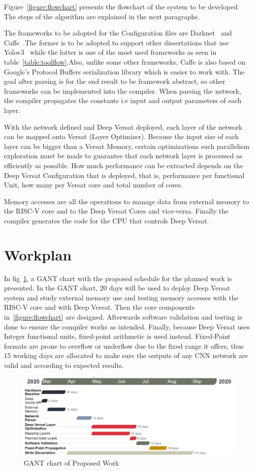 Figure~\ref{figure:flowchart} presents the flowchart of the system to be developed. The steps
of the algorithm are explained in the next paragraphs.


The frameworks to be adopted for the Configuration files are Darknet~\cite{darknet} and Caffe~\cite{caffe}.The former is to be adopted
to support other dissertations that use Yolov3~\cite{yolov3} while the latter is one of the most used frameworks as seen in table~\ref{table:toolflow}.Also,
unlike some other frameworks, Caffe is also based on Google's Protocol Buffers serialization library which is easier to work with.
The goal after parsing is for the end result to be framework abstract, so other frameworks can be implemented into the compiler.
When parsing the network, the compiler propagates the constants i.e input and output parameters of each layer.

With the network defined and Deep Versat deployed, each layer of the network can be mapped onto Versat (Layer Optimizer). Because the input size of each layer
can be bigger than a Versat Memory, certain optimizations such parallelism exploration must be made to guarantee that each network layer is processed as efficiently as possible. 
How much performance can be extracted depends on the Deep Versat Configuration that is deployed, that is, performance per functional Unit, how many per Versat core and
total number of cores.

Memory accesses are all the operations to manage data from external memory to the RISC-V core and to the Deep Versat Cores and vice-versa.
Finally the compiler generates the code for the CPU that controls Deep Versat.

\section{Workplan}

In fig~\ref{figure:gant}, a GANT chart with the proposed schedule for the
planned work is presented. In the GANT chart, 20 days will be used to deploy Deep Versat system and study external memory use and testing
memory accesses with the RISC-V core and with Deep Versat. Then the core components in~\ref{figure:flowchart} are designed. Afterwards
software validation and testing is done to ensure the compiler works as intended. Finally, because Deep Versat uses Integer functional units, fixed-point arithmetic
is used instead. Fixed-Point formats are prone to overflow or underflow due to the fixed range it offers, thus 15 working days are allocated to
make sure the outputs of any CNN network are valid and according to expected results. 

\begin{figure}[!htpb]
    \includegraphics[width=1\textwidth]{Figures/gant22.png}
    \caption{GANT chart of Proposed Work}
    \label{figure:gant}
\end{figure}





